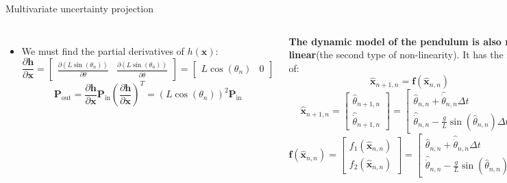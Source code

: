 \begin{frame}{Multivariate uncertainty projection}
\begin{columns}
\begin{itemize}
    \item We must find the partial derivatives of $h(\mathbf{x})$:
\[
\frac{\partial \mathbf{h}}{\partial \mathbf{x}} =
\begin{bmatrix}
\frac{\partial (L \sin(\theta_n))}{\partial \theta} & \frac{\partial (L \sin(\theta_n))}{\partial \dot{\theta}}
\end{bmatrix}
=
\begin{bmatrix}
L \cos(\theta_n) & 0
\end{bmatrix}
\]
\[
\mathbf{P}_{\text{out}} = \frac{\partial \mathbf{h}}{\partial \mathbf{x}} \mathbf{P}_{\text{in}} \left( \frac{\partial \mathbf{h}}{\partial \mathbf{x}} \right)^T = (L \cos(\theta_n))^2 \mathbf{P}_{\text{in}}
\]

\end{itemize}

\textbf{The dynamic model of the pendulum is also non-linear}(the second type of non-linearity). It has the form of:
\[
\hat{\mathbf{x}}_{n+1,n} = \mathbf{f}(\hat{\mathbf{x}}_{n,n})
\]
\[
\hat{\mathbf{x}}_{n+1,n} =
\begin{bmatrix}
\hat{\theta}_{n+1,n} \\
\hat{\dot{\theta}}_{n+1,n}
\end{bmatrix}
=
\begin{bmatrix}
\hat{\theta}_{n,n} + \hat{\dot{\theta}}_{n,n} \Delta t \\
\hat{\dot{\theta}}_{n,n} - \frac{g}{L} \sin(\hat{\theta}_{n,n}) \Delta t
\end{bmatrix}
\]
\[
\mathbf{f}(\hat{\mathbf{x}}_{n,n}) =
\begin{bmatrix}
f_1(\hat{\mathbf{x}}_{n,n}) \\
f_2(\hat{\mathbf{x}}_{n,n})
\end{bmatrix}
=
\begin{bmatrix}
\hat{\theta}_{n,n} + \hat{\dot{\theta}}_{n,n} \Delta t \\
\hat{\dot{\theta}}_{n,n} - \frac{g}{L} \sin(\hat{\theta}_{n,n}) \Delta t
\end{bmatrix}
\]

\begin{itemize}
    \item The dynamic model function $f(\hat{\mathbf{x}}_{n,n})$ is a matrix that contains two different sub-functions. We should find partial derivatives for each sub-function.
\end{itemize}



\end{columns}
\end{frame}
